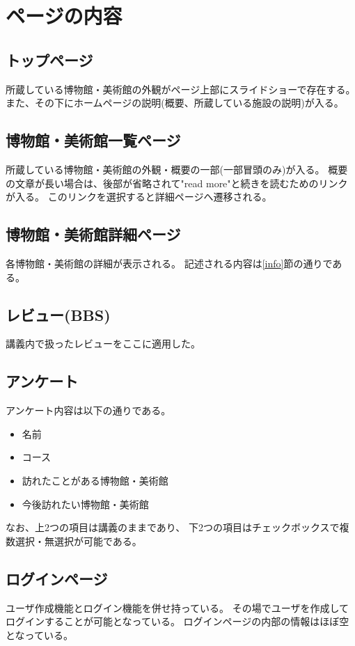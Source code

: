 \documentclass[11pt,a4paper, uplatex]{jsarticle}
\begin{document}
\section{ページの内容}

\subsection{トップページ}
所蔵している博物館・美術館の外観がページ上部にスライドショーで存在する。
また、その下にホームページの説明(概要、所蔵している施設の説明)が入る。

\subsection{博物館・美術館一覧ページ}
所蔵している博物館・美術館の外観・概要の一部(一部冒頭のみ)が入る。
概要の文章が長い場合は、後部が省略されて"read more"と続きを読むためのリンクが入る。
このリンクを選択すると詳細ページへ遷移される。

\subsection{博物館・美術館詳細ページ}
各博物館・美術館の詳細が表示される。
記述される内容は\ref{info}節の通りである。

\subsection{レビュー(BBS)}
講義内で扱ったレビューをここに適用した。

\subsection{アンケート}
アンケート内容は以下の通りである。
\begin{itemize}
 \item 名前
 \item コース
 \item 訪れたことがある博物館・美術館
 \item 今後訪れたい博物館・美術館
\end{itemize}
なお、上2つの項目は講義のままであり、
下2つの項目はチェックボックスで複数選択・無選択が可能である。

\subsection{ログインページ}
ユーザ作成機能とログイン機能を併せ持っている。
その場でユーザを作成してログインすることが可能となっている。
ログインページの内部の情報はほぼ空となっている。
\end{document}
